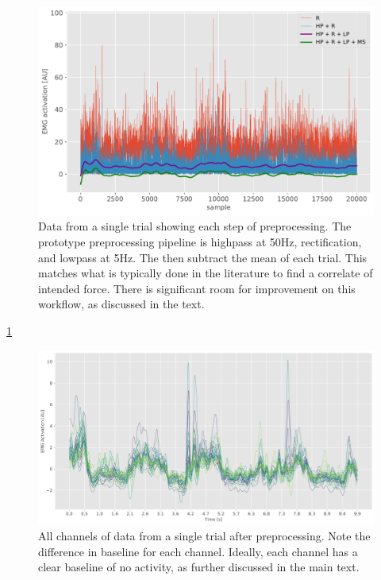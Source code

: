 \documentclass[
  a4paper,
]{article}
\begin{document}
\begin{figure}
\hypertarget{fig:preprocessing_steps}{%
\centering
\includegraphics[width=1\textwidth,height=\textheight]{images/data_analysis/fingers/preprocessing_steps.pdf}
\caption{Data from a single trial showing each step of preprocessing.
The prototype preprocessing pipeline is highpass at 50Hz, rectification,
and lowpass at 5Hz. The then subtract the mean of each trial. This
matches what is typically done in the literature to find a correlate of
intended force. There is significant room for improvement on this
workflow, as discussed in the text.}\label{fig:preprocessing_steps}
}
\end{figure}

\cref{fig:preprocessing_steps}

\begin{figure}
\hypertarget{fig:preprocessed_data}{%
\centering
\includegraphics[width=1\textwidth,height=\textheight]{images/data_analysis/fingers/preprocessed_data.pdf}
\caption{All channels of data from a single trial after preprocessing.
Note the difference in baseline for each channel. Ideally, each channel
has a clear baseline of no activity, as further discussed in the main
text.}\label{fig:preprocessed_data}
}
\end{figure}
\end{document}

